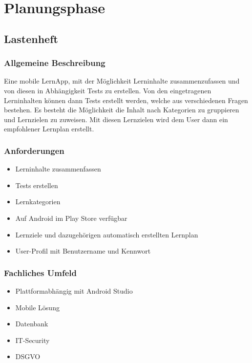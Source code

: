 \section{Planungsphase}
\label{Planung}

\subsection{Lastenheft}

\subsubsection{Allgemeine Beschreibung}
Eine mobile LernApp, mit der Möglichkeit Lerninhalte zusammenzufassen und von diesen in Abhängigkeit Tests zu erstellen.
Von den eingetragenen Lerninhalten können dann Tests erstellt werden, welche aus verschiedenen Fragen bestehen.
Es besteht die Möglichkeit die Inhalt nach Kategorien zu gruppieren und Lernzielen zu zuweisen.
Mit diesen Lernzielen wird dem User dann ein empfohlener Lernplan erstellt.

\subsubsection{Anforderungen}
\begin{itemize}
    \item Lerninhalte zusammenfassen
    \item Tests erstellen
    \item Lernkategorien
    \item Auf Android im Play Store verfügbar
    \item Lernziele und dazugehörigen automatisch erstellten Lernplan
    \item User-Profil mit Benutzername und Kennwort
\end{itemize}

\subsubsection{Fachliches Umfeld}
\begin{itemize}
    \item Plattformabhängig mit Android Studio
    \item Mobile Lösung
    \item Datenbank
    \item IT-Security
    \item DSGVO
\end{itemize}

